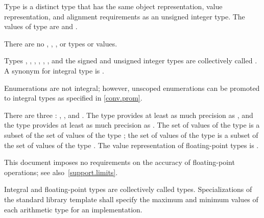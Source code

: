\pnum
{}%
%
Type  is a distinct type that has
the same object representation,
value representation, and
alignment requirements as
an  unsigned integer type.
The values of type  are
 and .
\begin{note}
There are no , ,
, or  types or values.
\end{note}

\pnum
{}%
Types
,
, ,
, , ,
and the signed and unsigned integer types are
collectively called
.
A synonym for integral type is .
\begin{note}
Enumerations are not integral;
however, unscoped enumerations can be promoted to integral types
as specified in \ref{conv.prom}.
\end{note}

\pnum
{}%
There are three :
%
,
%
,
and
%
. The type  provides at least as much
precision as , and the type  provides at
least as much precision as . The set of values of the type
 is a subset of the set of values of the type
; the set of values of the type  is a subset
of the set of values of the type . The value
representation of floating-point types is .
%
\begin{note}
This document imposes no requirements on the accuracy of
floating-point operations; see also~\ref{support.limits}.
\end{note}
Integral and floating-point types are collectively
called  types.
%
Specializations of the standard library template
 shall specify the
maximum and minimum values of each arithmetic type for an
implementation.

